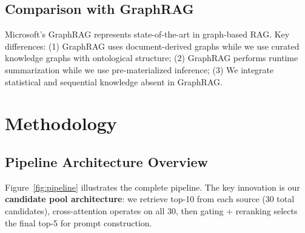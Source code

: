 \documentclass[10pt,twocolumn]{article}
\begin{document}
\subsection{Comparison with GraphRAG}
\label{sec:graphrag}

Microsoft's GraphRAG \cite{edge2024graphrag,microsoft2024graphrag} represents state-of-the-art in graph-based RAG. Key differences: (1) GraphRAG uses document-derived graphs while we use curated knowledge graphs with ontological structure; (2) GraphRAG performs runtime summarization while we use pre-materialized inference; (3) We integrate statistical and sequential knowledge absent in GraphRAG.

\section{Methodology}
\label{sec:method}

\subsection{Pipeline Architecture Overview}
\label{sec:pipeline}

Figure~\ref{fig:pipeline} illustrates the complete pipeline. The key innovation is our \textbf{candidate pool architecture}: we retrieve top-10 from each source (30 total candidates), cross-attention operates on all 30, then gating + reranking selects the final top-5 for prompt construction.
\end{document}
